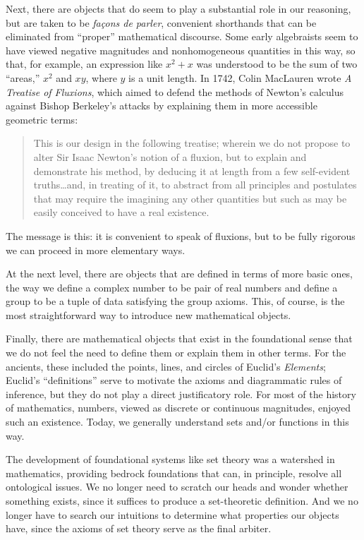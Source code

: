 \documentclass[11pt]{article}
\begin{document}
Next, there are objects that do seem to play a substantial role in our reasoning, but are taken to be \emph{fa\c{c}ons de parler}, convenient shorthands that can be eliminated from ``proper'' mathematical discourse. Some early algebraists seem to have viewed negative magnitudes and nonhomogeneous quantities in this way, so that, for example, an expression like $x^2 + x$ was understood to be the sum of two ``areas,'' $x^2$ and $xy$, where $y$ is a unit length. In 1742, Colin MacLauren wrote \emph{A Treatise of Fluxions}, which aimed to defend the methods of Newton's calculus against Bishop Berkeley's attacks by explaining them in more accessible geometric terms:
\begin{quote}
This is our design in the following treatise; wherein we do not propose to alter Sir {\sc Isaac Newton}'s notion of a fluxion, but to explain and demonstrate his method, by deducing it at length from a few self-evident truths\ldots and, in treating of it, to abstract from all principles and postulates that may require the imagining any other quantities but such as may be easily conceived to have a real existence. 
\end{quote}
The message is this: it is convenient to speak of fluxions, but to be fully rigorous we can proceed in more elementary ways.

At the next level, there are objects that are defined in terms of more basic ones, the way we define a complex number to be pair of real numbers and define a group to be a tuple of data satisfying the group axioms. This, of course, is the most straightforward way to introduce new mathematical objects. 

Finally, there are mathematical objects that exist in the foundational sense that we do not feel the need to define them or explain them in other terms. For the ancients, these included the points, lines, and circles of Euclid's \emph{Elements}; Euclid's ``definitions'' serve to motivate the axioms and diagrammatic rules of inference, but they do not play a direct justificatory role. For most of the history of mathematics, numbers, viewed as discrete or continuous magnitudes, enjoyed such an existence. Today, we generally understand sets and/or functions in this way.

The development of foundational systems like set theory was a watershed in mathematics, providing bedrock foundations that can, in principle, resolve all ontological issues. We no longer need to scratch our heads and wonder whether something exists, since it suffices to produce a set-theoretic definition. And we no longer have to search our intuitions to determine what properties our objects have, since the axioms of set theory serve as the final arbiter.
\end{document}
